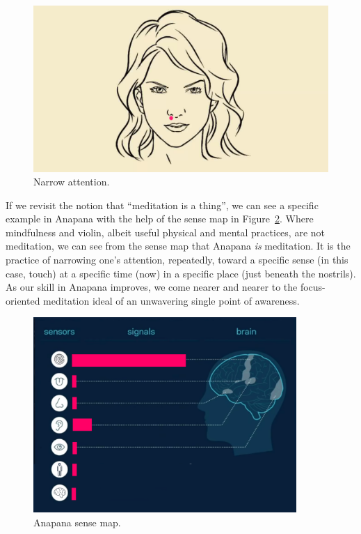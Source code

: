 \documentclass{article}
\begin{document}
\begin{figure}[H]
  \centering
  \includegraphics[width=\linewidth]{images/face-attention-narrow.jpg}
  \caption{Narrow attention.}
  \label{fig:narrow-attention}
\end{figure}

If we revisit the notion that ``meditation is a thing'', we can see a specific example in Anapana with the help of the sense map in Figure~\ref{fig:anapana-sense-map}. Where mindfulness and violin, albeit useful physical and mental practices, are not meditation, we can see from the sense map that Anapana \textit{is} meditation. It is the practice of narrowing one's attention, repeatedly, toward a specific sense (in this case, touch) at a specific time (now) in a specific place (just beneath the nostrils). As our skill in Anapana improves, we come nearer and nearer to the focus-oriented meditation ideal of an unwavering single point of awareness.

\begin{figure}[H]
  \centering
  \includegraphics[width=10cm]{images/ma-anapana.png}
  \caption{Anapana sense map.}
  \label{fig:anapana-sense-map}
\end{figure}
\end{document}
